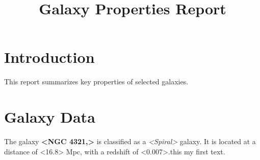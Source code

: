 \documentclass{article}
\title{Galaxy Properties Report}
\author{}
\date{}
\begin{document}
\maketitle

\section{Introduction}
This report summarizes key properties of selected galaxies.

\section{Galaxy Data}
The galaxy \textbf{<NGC 4321,>} is classified as a \textit{<Spiral>} galaxy. 
It is located at a distance of <16.8> Mpc, with a redshift of <0.007>.this my first text.
\end{document}
